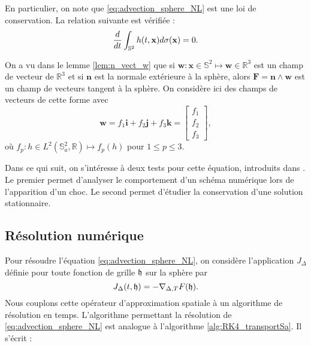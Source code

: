 En particulier, on note que \eqref{eq:advection_sphere_NL} est une loi de conservation. La relation suivante est vérifiée :
\begin{equation}
\dfrac{d}{dt} \displaystyle\int_{\mathbb{S}^2} h(t,\mathbf{x}) d \sigma(\mathbf{x}) = 0.
\end{equation}

On a vu dans le lemme \ref{lem:n_vect_w} que si $\mathbf{w} : \mathbf{x} \in \mathbb{S}^2 \mapsto \mathbf{w} \in \mathbb{R}^3$ est un champ de vecteur de $\mathbb{R}^3$ et si $\mathbf{n}$ est la normale extérieure à la sphère, alors $\mathbf{F} = \mathbf{n} \wedge \mathbf{w}$ est un champ de vecteurs tangent à la sphère. On considère ici des champs de vecteurs de cette forme avec 
\begin{equation}
\mathbf{w} = f_1 \mathbf{i} + f_2 \mathbf{j}+ f_3 \mathbf{k} = \begin{bmatrix}
f_1 \\ f_2 \\ f_3
\end{bmatrix},
\end{equation}
où $f_p : h \in L^2(\mathbb{S}_a^2, \mathbb{R}) \mapsto f_p(h)$  pour $1 \leq p \leq 3$.


Dans ce qui suit, on s'intéresse à deux tests pour cette équation, introduits dans \cite{BenArtzi2009}. Le premier permet d'analyser le comportement d'un schéma numérique lors de l'apparition d'un choc. Le second permet d'étudier la conservation d'une solution stationnaire.










\subsection{Résolution numérique}

Pour résoudre l'équation \eqref{eq:advection_sphere_NL}, on considère l'application $J_{\Delta}$ définie pour toute fonction de grille $\mathfrak{h}$ sur la sphère par
\begin{equation}
J_{\Delta}(t,\mathfrak{h}) = - \nabla_{\Delta, T} F(\mathfrak{h}).
\end{equation}
Nous couplons cette opérateur d'approximation spatiale à un algorithme de résolution en temps. L'algorithme permettant la résolution de \eqref{eq:advection_sphere_NL} est analogue à l'algorithme \ref{alg:RK4_transportSa}. Il s'écrit :

